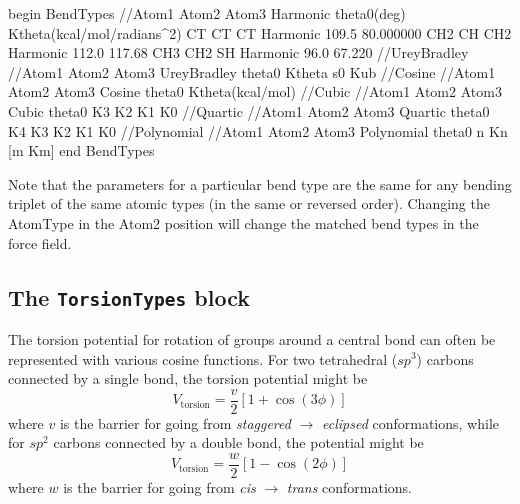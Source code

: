 \documentclass[letterpaper]{report}
\begin{document}
\begin{code}[caption={[An example of a BendTypes block.] A
simple example of a BendTypes block.  By convention, equilibrium angles
($\theta_0$) are given in degrees but force constants are given in
units so that when multiplied by the correct power of angle (in
radians) they return energies in kcal/mol.  For example $k$ for a 
Harmonic bend is in units of kcal/mol/radians$^2$.},
label={sch:BendTypes}]
begin BendTypes
//Atom1 Atom2   Atom3   Harmonic      theta0(deg) Ktheta(kcal/mol/radians^2)
CT      CT      CT      Harmonic      109.5        80.000000
CH2     CH      CH2     Harmonic      112.0       117.68
CH3     CH2     SH      Harmonic       96.0        67.220
//UreyBradley
//Atom1 Atom2   Atom3   UreyBradley   theta0      Ktheta  s0  Kub
//Cosine
//Atom1 Atom2   Atom3   Cosine        theta0      Ktheta(kcal/mol)
//Cubic
//Atom1 Atom2   Atom3   Cubic         theta0      K3      K2  K1   K0
//Quartic
//Atom1 Atom2   Atom3   Quartic       theta0      K4      K3  K2   K1   K0
//Polynomial
//Atom1 Atom2   Atom3   Polynomial    theta0      n       Kn  [m   Km]
end BendTypes
\end{code}

Note that the parameters for a particular bend type are the same for
any bending triplet of the same atomic types (in the same or reversed
order).  Changing the AtomType in the Atom2 position will change the
matched bend types in the force field.

\subsection{\label{section:ffTorsion}The {\tt TorsionTypes} block}
The torsion potential for rotation of groups around a central bond can
often be represented with various cosine functions.  For two
tetrahedral ($sp^3$) carbons connected by a single bond, the torsion
potential might be
\begin{equation*}
V_{\text{torsion}} = \frac{v}{2} \left[ 1 + \cos( 3 \phi ) \right]
\end{equation*}
where $v$ is the barrier for going from {\em staggered} $\rightarrow$
{\em eclipsed} conformations, while for $sp^2$ carbons connected by a
double bond, the potential might be
\begin{equation*}
V_{\text{torsion}} = \frac{w}{2} \left[ 1 - \cos( 2 \phi ) \right]
\end{equation*}
where $w$ is the barrier for going from  {\em cis} $\rightarrow$ {\em
  trans} conformations.
\end{document}
